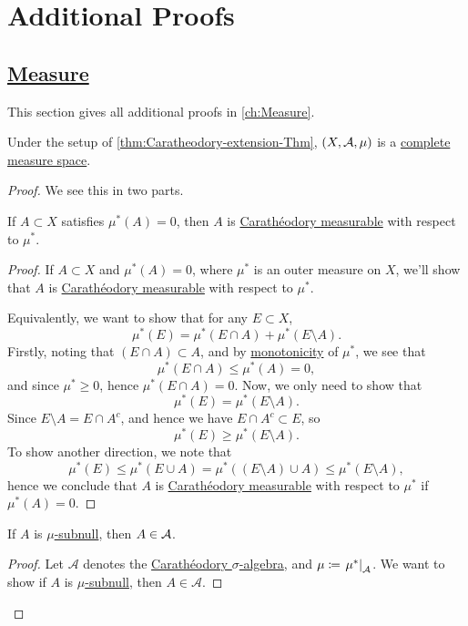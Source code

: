 \chapter{Additional Proofs}\label{Apx:Additional-Proofs}
\section{\hyperref[ch:Measure]{Measure}}
This section gives all additional proofs in \autoref{ch:Measure}.
\begin{theorem}\label{thm:Caratheodory-extension-Thm:3.}
	Under the setup of \autoref{thm:Caratheodory-extension-Thm}, \((X, \mathcal{\MakeUppercase{a}} , \mu )\) is a \hyperref[def:complete-measure-space]{complete measure space}.
\end{theorem}
\begin{proof}
	We see this in two parts.
	\begin{claim}
		If \(A\subset X\) satisfies \(\mu ^{*} (A) = 0\), then \(A\) is \hyperref[def:C-measurable]{Carathéodory measurable} with respect to \(\mu ^{\ast} \).
	\end{claim}
	\begin{proof}
		If \(A\subset X\) and \(\mu^{*} (A) = 0\), where \(\mu^{*} \) is an outer measure on \(X\), we'll show that \(A\) is \hyperref[def:C-measurable]{Carathéodory measurable}
		with respect to \(\mu^{*} \).

		\par Equivalently, we want to show that for any \(E\subset X\),
		\[
			\mu^{*} (E) = \mu^{*} (E\cap A) + \mu^{*} (E \setminus A).
		\]
		Firstly, noting that \((E\cap A)\subset A\), and by \hyperref[def:outer-measure-montonicity]{monotonicity} of \(\mu^{*} \), we see that
		\[
			\mu^{*} (E\cap A)\leq \mu^{*} (A) = 0,
		\]
		and since \(\mu^{*} \geq 0\), hence \(\mu^{*} (E\cap A) = 0\). Now, we only need to show that
		\[
			\mu^{*} (E) = \mu^{*} (E\setminus A).
		\]
		Since \(E\setminus A = E\cap A^{c} \), and hence we have \(E\cap A^{c} \subset E\), so
		\[
			\mu^{*} (E)\geq \mu^{*} (E\setminus A).
		\]
		To show another direction, we note that
		\[
			\mu^{*} (E)\leq \mu^{*} (E\cup A) = \mu^{*} ((E\setminus A) \cup A) \leq \mu^{*} (E\setminus A),
		\]
		hence we conclude that \(A\) is \hyperref[def:C-measurable]{Carathéodory measurable} with respect to \(\mu^{*} \) if \(\mu^{*} (A)=0\).
	\end{proof}

	\begin{claim}
		If \(A\) is \hyperref[def:mu-subnull-set]{\(\mu\)-subnull}, then \(A\in \mathcal{\MakeUppercase{a}} \).
	\end{claim}
	\begin{proof}
		Let \(\mathcal{A} \) denotes the \hyperref[thm:Caratheodory-extension-Thm]{Carathéodory \(\sigma\)-algebra}, and \(\mu\coloneqq \left.\mu^{*} \right\vert_{\mathcal{A} }^{} \). We want to show if
		\(A\) is \hyperref[def:mu-subnull-set]{\(\mu\)-subnull}, then \(A\in\mathcal{A} \).


\end{proof}
\end{proof}
